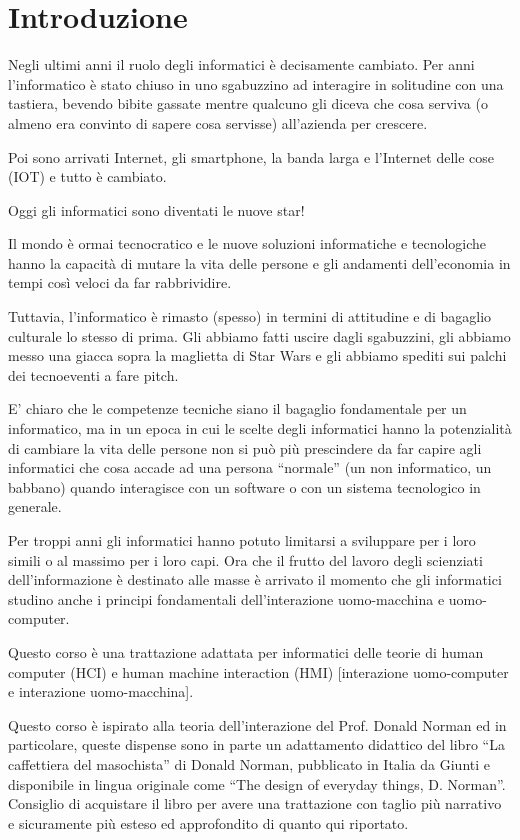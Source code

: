 

\chapter{Introduzione}

Negli ultimi anni il ruolo degli informatici è decisamente cambiato. Per anni l'informatico è stato chiuso in uno sgabuzzino ad interagire in solitudine con una tastiera, bevendo bibite gassate mentre qualcuno gli diceva che cosa serviva (o almeno era convinto di sapere cosa servisse) all'azienda per crescere.

Poi sono arrivati Internet, gli smartphone, la banda larga e l'Internet delle cose (IOT) e tutto è cambiato. 

Oggi gli informatici sono diventati le nuove star! 

Il mondo è ormai tecnocratico e le nuove soluzioni informatiche e tecnologiche hanno la capacità di mutare la vita delle persone e gli andamenti dell'economia in tempi così veloci da far rabbrividire.

Tuttavia, l'informatico è rimasto (spesso) in termini di attitudine e di bagaglio culturale lo stesso di prima. Gli abbiamo fatti uscire dagli sgabuzzini, gli abbiamo messo una giacca sopra la maglietta di Star Wars e gli abbiamo spediti sui palchi dei tecnoeventi a fare pitch.

E' chiaro che le competenze tecniche siano il bagaglio fondamentale per un informatico, ma in un epoca in cui le scelte degli informatici hanno la potenzialità di cambiare la vita delle persone non si può più prescindere da far capire agli informatici che cosa accade ad una persona ``normale'' (un non informatico, un babbano) quando interagisce con un software o con un sistema tecnologico in generale. 

Per troppi anni gli informatici hanno potuto limitarsi a sviluppare per i loro simili o al massimo per i loro capi. Ora che il frutto del lavoro degli scienziati dell'informazione è destinato alle masse è arrivato il momento che gli informatici studino anche i principi fondamentali dell'interazione uomo-macchina e uomo-computer.

Questo corso è una trattazione adattata per informatici delle teorie di human computer (HCI) e human machine interaction (HMI) [interazione uomo-computer e interazione uomo-macchina]. 

Questo corso è ispirato alla teoria dell'interazione del Prof. Donald Norman ed in particolare, queste dispense sono in parte un adattamento didattico del libro ``La caffettiera del masochista'' di Donald Norman, pubblicato in Italia da Giunti e disponibile in lingua originale come ``The design of everyday things, D. Norman''. Consiglio di acquistare il libro per avere una trattazione con taglio più narrativo e sicuramente più esteso ed approfondito di quanto qui riportato.

